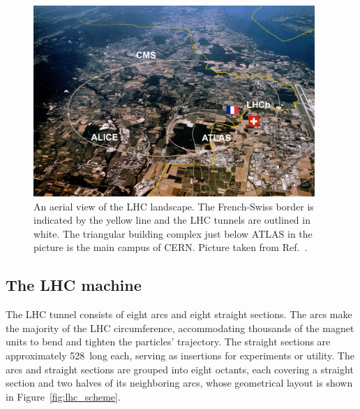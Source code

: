 \begin{figure}[!htb]
    \centering
    \captionsetup{justification=justified}
    \includegraphics[width=0.95\textwidth]{pics/LHC_CMS/LHC_landscape.png}
    \caption{An aerial view of the LHC landscape. The French-Swiss border is indicated by the yellow line and the LHC tunnels are outlined in white.
             The triangular building complex just below ATLAS in the picture is the main campus of CERN.
             Picture taken from Ref.~\cite{aerial_lhc}.}
    \label{fig:lhc_landscape}
\end{figure}


\subsection{The LHC machine}
The LHC tunnel consists of eight arcs and eight straight sections.
The arcs make the majority of the LHC circumference, accommodating thousands of the magnet units to bend and tighten the particles' trajectory.
The straight sections are approximately 528~\meter long each, serving as insertions for experiments or utility. 
The arcs and straight sections are grouped into eight octants, each covering a straight section and two halves of its neighboring arcs,
whose geometrical layout is shown in Figure~\ref{fig:lhc_scheme}. 

